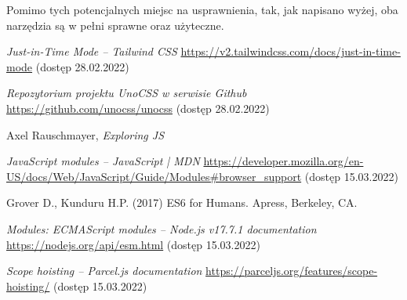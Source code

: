 \documentclass{SGGW-thesis}
\begin{document}
Pomimo tych potencjalnych miejsc na usprawnienia, tak, jak napisano wyżej, oba narzędzia są w pełni sprawne oraz użyteczne.


\begin{thebibliography}{9}
\textit{Just-in-Time Mode -- Tailwind CSS}
\url{https://v2.tailwindcss.com/docs/just-in-time-mode} (dostęp 28.02.2022)

\textit{Repozytorium projektu UnoCSS w serwisie Github}
\url{https://github.com/unocss/unocss} (dostęp 28.02.2022)

Axel Rauschmayer, \textit{Exploring JS}

\textit{JavaScript modules -- JavaScript | MDN}
\url{https://developer.mozilla.org/en-US/docs/Web/JavaScript/Guide/Modules#browser_support} (dostęp 15.03.2022)

Grover D., Kunduru H.P. (2017) ES6 for Humans. Apress, Berkeley, CA.

\textit{Modules: ECMAScript modules -- Node.js v17.7.1 documentation}
\url{https://nodejs.org/api/esm.html} (dostęp 15.03.2022)

\textit{Scope hoisting -- Parcel.js documentation}
\url{https://parceljs.org/features/scope-hoisting/} (dostęp 15.03.2022)

\end{thebibliography}

\beforelastpage
\end{document}
